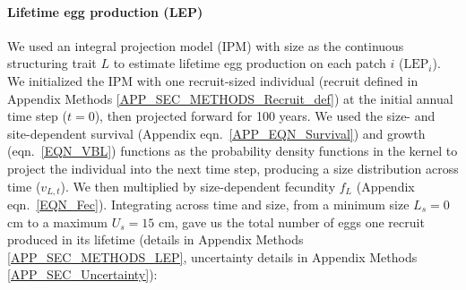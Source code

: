 \documentclass[12pt, oneside]{article}   	%
\begin{document}




\paragraph*{Lifetime egg production (LEP)}

We used an integral projection model (IPM) \citep{ellner2016data} with size as the continuous structuring trait $L$ to estimate lifetime egg production on each patch $i$ ($\text{LEP}_i$). We initialized the IPM with one recruit-sized individual (recruit defined in Appendix Methods \ref{APP_SEC_METHODS_Recruit_def}) at the initial annual time step ($t=0$), then projected forward for 100 years. We used the size- and site-dependent survival (Appendix eqn.\ \ref{APP_EQN_Survival}) and growth (eqn.\ \ref{EQN_VBL}) functions as the probability density functions in the kernel to project the individual into the next time step, producing a size distribution across time ($v_{L,t}$). We then multiplied by size-dependent fecundity $f_L$ (Appendix eqn.\ \ref{EQN_Fec}). Integrating across time and size, from a minimum size $L_s=0$ cm to a maximum $U_s=15$ cm, gave us the total number of eggs one recruit produced in its lifetime (details in Appendix Methods \ref{APP_SEC_METHODS_LEP}, uncertainty details in Appendix Methods \ref{APP_SEC_Uncertainty}):
\end{document}
